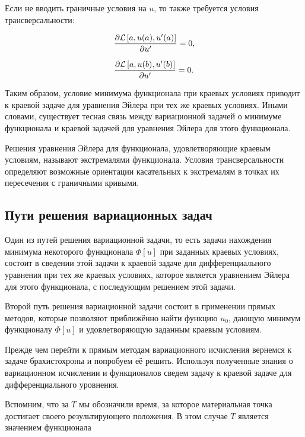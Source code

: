 \documentclass{article}
\begin{document}
\noindent Если не вводить граничные условия на $u$, то также требуется условия трансверсальности:

\begin{displaymath}
	\frac{\partial \mathcal{L} \left[a, u(a), u'(a) \right] }{\partial u'} = 0,
\end{displaymath}

\begin{displaymath}
	\frac{\partial \mathcal{L} \left[a, u(b), u'(b) \right] }{\partial u'} = 0.
\end{displaymath}


Таким образом, условие минимума функционала при краевых условиях приводит к краевой задаче для уравнения Эйлера при тех же краевых условиях. Иными словами, существует тесная связь между вариационной задачей о минимуме функционала и краевой задачей для уравнения Эйлера для этого функционала.

\begin{warn}[Важно!]
	Решения уравнения Эйлера для функционала, удовлетворяющие краевым условиям, называют экстремалями функционала. Условия трансверсальности определяют возможные ориентации касательных к экстремалям в точках их пересечения с граничными кривыми.
\end{warn}


\subsection{Пути решения вариационных задач}

Один из путей решения вариационной задачи, то есть задачи нахождения минимума некоторого функционала $\Phi[u]$ при заданных краевых условиях, состоит в сведении этой задачи к краевой задаче для дифференциального уравнения при тех же краевых условиях, которое является уравнением Эйлера для этого функционала, с последующим решением этой задачи.

Второй путь решения вариационной задачи состоит в применении прямых методов, которые позволяют приближённо найти функцию $u_{0}$, дающую минимум функционалу $\Phi[u]$ и удовлетворяющую заданным краевым условиям.

Прежде чем перейти к прямым методам вариационного исчисления вернемся к задаче брахистохроны и попробуем её решить. Используя полученные знания о вариационном исчислении и функционалов сведем задачу к краевой задаче для дифференциального уровнения.

Вспомним, что за $T$ мы обозначили время, за которое материальная точка достигает своего результирующего положения. В этом случае $T$ является значением функционала
\end{document}
